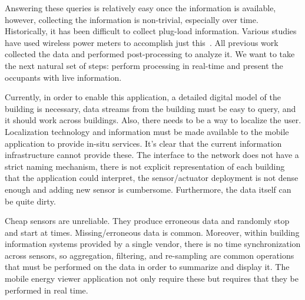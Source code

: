 Answering these queries is relatively easy once the information is available, however, collecting the information
is non-trivial, especially over time.  Historically, it has been difficult to collect plug-load information.
Various studies have used wireless power meters to accomplish just this~\cite{stephscale, lanz, aceee_mobileaudit}.
All previous work collected the data and performed post-processing to analyze it.  We want to take the next
natural set of steps: perform processing in real-time and present the occupants with live information.

Currently, in order to enable this application, a detailed digital model of the building is necessary, data streams from the building must
be easy to query, and it should work across buildings.  Also, there needs to be a way to localize the user. 
Localization technology and information must be made available to the mobile application to provide in-situ services.
It's clear that the current information infrastructure cannot provide these.  The interface to the network does not have
a strict naming mechanism, there is not explicit representation of each building that the application could interpret, 
the sensor/actuator deployment is not dense enough and adding new sensor is cumbersome.  Furthermore, the data itself can be quite dirty.

Cheap sensors are unreliable.  They produce erroneous data and randomly stop and start at times.  Missing/erroneous data is common.
Moreover, within building information systems provided by a single vendor, there is no time synchronization across sensors, so
aggregation, filtering, and re-sampling are common operations that must be performed on the data in order to summarize and display it.
The mobile energy viewer application not only require these but requires that they be performed in real time.




